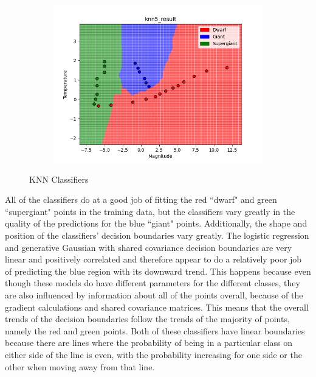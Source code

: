 \documentclass[submit]{harvardml}
\begin{document}
\begin{enumerate}
\begin{figure}[h]
\begin{subfigure}[b]{0.475\textwidth}
				\includegraphics[width=\textwidth]{knn5_result}
			\end{subfigure}
			\caption{KNN Classifiers}
			\label{fig:knn_classifiers}
		\end{figure}

		All of the classifiers do at a good job of fitting the red ``dwarf" and green ``supergiant" points in the training data, but the classifiers vary greatly in the quality of the predictions for the blue ``giant" points. Additionally, the shape and position of the classifiers' decision boundaries vary greatly. The logistic regression and generative Gaussian with shared covariance decision boundaries are very linear and positively correlated and therefore appear to do a relatively poor job of predicting the blue region with its downward trend. This happens because even though these models do have different parameters for the different classes, they are also influenced by information about all of the points overall, because of the gradient calculations and shared covariance matrices. This means that the overall trends of the decision boundaries follow the trends of the majority of points, namely the red and green points. Both of these classifiers have linear boundaries because there are lines where the probability of being in a particular class on either side of the line is even, with the probability increasing for one side or the other when moving away from that line.
		

\end{enumerate}
\end{document}
